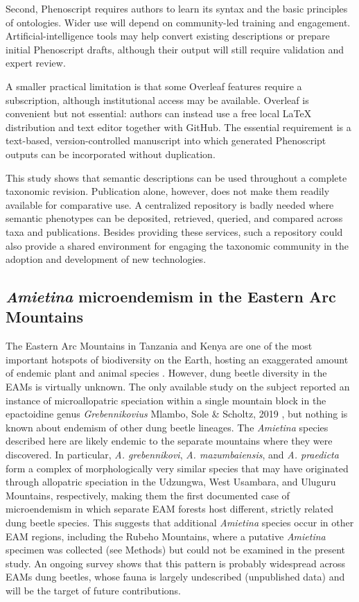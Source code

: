 \documentclass[fleqn,10pt,lineno]{wlpeerj}
\begin{document}
Second, Phenoscript requires authors to learn its syntax and the basic principles of ontologies. Wider use will depend on community-led training and engagement. Artificial-intelligence tools may help convert existing descriptions or prepare initial Phenoscript drafts, although their output will still require validation and expert review.

A smaller practical limitation is that some Overleaf features require a subscription, although institutional access may be available. Overleaf is convenient but not essential: authors can instead use a free local \LaTeX{} distribution and text editor together with GitHub. The essential requirement is a text-based, version-controlled manuscript into which generated Phenoscript outputs can be incorporated without duplication.


This study shows that semantic descriptions can be used throughout a complete taxonomic revision. Publication alone, however, does not make them readily available for comparative use. A centralized repository is badly needed where semantic phenotypes can be deposited, retrieved, queried, and compared across taxa and publications. Besides providing these services, such a repository could also provide a shared environment for engaging the taxonomic community in the adoption and development of new technologies.








\subsection*{\textit{Amietina} microendemism in the Eastern Arc Mountains}

The Eastern Arc Mountains in Tanzania and Kenya are one of the most important hotspots of biodiversity on the Earth, hosting an exaggerated amount of endemic plant and animal species \citep{burgess2007biological}. However, dung beetle diversity in the EAMs is virtually unknown. The only available study on the subject reported an instance of microallopatric speciation within a single mountain block in the epactoidine genus \textit{Grebennikovius} Mlambo, Sole \& Scholtz, 2019 \citep{montanaro2024microallopatric}, but nothing is known about endemism of other dung beetle lineages. The \textit{Amietina} species described here are likely endemic to the separate mountains where they were discovered. In particular, \textit{A. grebennikovi}, \textit{A. mazumbaiensis}, and \textit{A. praedicta} form a complex of morphologically very similar species that may have originated through allopatric speciation in the Udzungwa, West Usambara, and Uluguru Mountains, respectively, making them the first documented case of microendemism in which separate EAM forests host different, strictly related dung beetle species. This suggests that additional \textit{Amietina} species occur in other EAM regions, including the Rubeho Mountains, where a putative \textit{Amietina} specimen was collected (see Methods) but could not be examined in the present study. An ongoing survey shows that this pattern is probably widespread across EAMs dung beetles, whose fauna is largely undescribed (unpublished data) and will be the target of future contributions.
\end{document}
